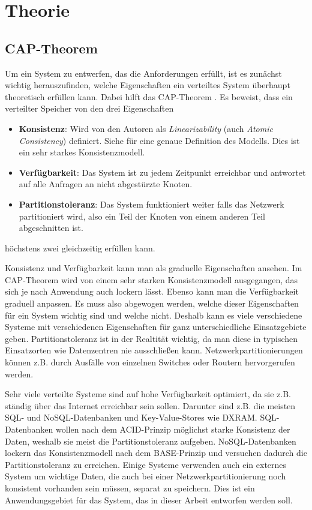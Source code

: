 \chapter{Theorie}
\label{theory}

\section{CAP-Theorem}
\label{cap}

Um ein System zu entwerfen, das die Anforderungen erfüllt, ist es zunächst wichtig herauszufinden, welche Eigenschaften ein verteiltes System überhaupt theoretisch erfüllen kann. Dabei hilft das CAP-Theorem \cite{cap}. Es beweist, dass ein verteilter Speicher von den drei Eigenschaften 
\begin{itemize}
	\item \textbf{Konsistenz}: Wird von den Autoren als \textit{Linearizability} (auch \textit{Atomic Consistency}) definiert. Siehe \cite{linearizability} für eine genaue Definition des Modells. Dies ist ein sehr starkes Konsistenzmodell.
	\item \textbf{Verfügbarkeit}: Das System ist zu jedem Zeitpunkt erreichbar und antwortet auf alle Anfragen an nicht abgestürzte Knoten.
	\item \textbf{Partitionstoleranz}: Das System funktioniert weiter falls das Netzwerk partitioniert wird, also ein Teil der Knoten von einem anderen Teil abgeschnitten ist.
\end{itemize}
 höchstens zwei gleichzeitig erfüllen kann. 

Konsistenz und Verfügbarkeit kann man als graduelle Eigenschaften ansehen. Im CAP-Theorem wird von einem sehr starken Konsistenzmodell ausgegangen, das sich je nach Anwendung auch lockern lässt. Ebenso kann man die Verfügbarkeit graduell anpassen. Es muss also abgewogen werden, welche dieser Eigenschaften für ein System wichtig sind und welche nicht. Deshalb kann es viele verschiedene Systeme mit verschiedenen Eigenschaften für ganz unterschiedliche Einsatzgebiete geben. Partitionstoleranz ist in der Realtität wichtig, da man diese in typischen Einsatzorten wie Datenzentren nie ausschließen kann. Netzwerkpartitionierungen können z.B. durch Ausfälle von einzelnen Switches oder Routern hervorgerufen werden. 

Sehr viele verteilte Systeme sind auf hohe Verfügbarkeit optimiert, da sie z.B. ständig über das Internet erreichbar sein sollen. Darunter sind z.B. die meisten SQL- und NoSQL-Datenbanken und Key-Value-Stores wie DXRAM. SQL-Datenbanken wollen nach dem ACID-Prinzip möglichst starke Konsistenz der Daten, weshalb sie meist die Partitionstoleranz aufgeben. NoSQL-Datenbanken lockern das Konsistenzmodell nach dem BASE-Prinzip und versuchen dadurch die Partitionstoleranz zu erreichen. Einige Systeme verwenden auch ein externes System um wichtige Daten, die auch bei einer Netzwerkpartitionierung noch konsistent vorhanden sein müssen, separat zu speichern. Dies ist ein Anwendungsgebiet für das System, das in dieser Arbeit entworfen werden soll.

